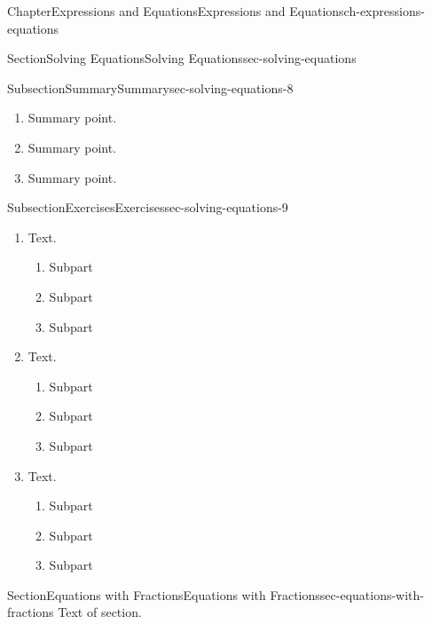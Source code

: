 \documentclass[twoside,11pt,]{book}
\numberwithin{equation}{chapter}
\begin{document}
\begin{chapterptx}{Chapter}{Expressions and Equations}{}{Expressions and Equations}{}{}{ch-expressions-equations}
\begin{sectionptx}{Section}{Solving Equations}{}{Solving Equations}{}{}{sec-solving-equations}
\typeout{************************************************}
%
\begin{subsectionptx}{Subsection}{Summary}{}{Summary}{}{}{sec-solving-equations-8}
%
\begin{enumerate}
\item{}Summary point.%
\item{}Summary point.%
\item{}Summary point.%
\end{enumerate}
%
\end{subsectionptx}
%
%
\typeout{************************************************}
\typeout{************************************************}
%
\begin{subsectionptx}{Subsection}{Exercises}{}{Exercises}{}{}{sec-solving-equations-9}
%
\begin{enumerate}
\item{}Text.%
\begin{enumerate}
\item{}Subpart%
\item{}Subpart%
\item{}Subpart%
\end{enumerate}
%
\item{}Text.%
\begin{enumerate}
\item{}Subpart%
\item{}Subpart%
\item{}Subpart%
\end{enumerate}
%
\item{}Text.%
\begin{enumerate}
\item{}Subpart%
\item{}Subpart%
\item{}Subpart%
\end{enumerate}
%
\end{enumerate}
%
\end{subsectionptx}
\end{sectionptx}
%
%
\typeout{************************************************}
\typeout{************************************************}
%
\begin{sectionptx}{Section}{Equations with Fractions}{}{Equations with Fractions}{}{}{sec-equations-with-fractions}
Text of section.%
\end{sectionptx}
%
%
\typeout{************************************************}

\end{chapterptx}
\end{document}
